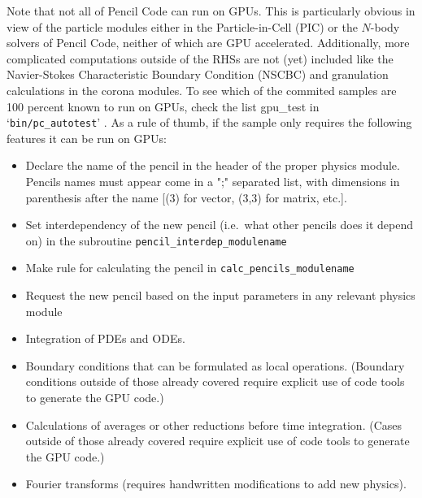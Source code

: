 \documentclass[\mydriver,12pt,twoside,notitlepage,a4paper]{article}
\makeatletter
\newcommand{\code}[1]{\texttt{#1}}
\newcommand{\file}[2][]{%
  \def\index@{#1}%
  `\texttt{#2}'%
  \ifx\index@\@empty\index[file]{#2@\texttt{#2}}%
  \else\index[file]{#1@\texttt{#1}}%
  \fi%
}
\makeatother
\begin{document}
Note that not all of Pencil Code can run on GPUs. 
This is particularly obvious in view of the particle modules either in the Particle-in-Cell (PIC) or the $N$-body solvers of Pencil Code, neither of which are GPU accelerated.
Additionally, more complicated computations outside of the RHSs are not (yet) included like the Navier-Stokes Characteristic Boundary Condition (NSCBC) and granulation calculations in the corona modules.
To see which of the commited samples are 100 percent known to run on GPUs, check the list gpu\_test in \file{bin/pc_autotest}.
As a rule of thumb, if the sample only requires the following features it can be run on GPUs:
\begin{itemize}
  \item Declare the name of the pencil in the header of the proper physics
      module. Pencils names must appear come in a ";" separated list, with
      dimensions in parenthesis after the name [(3) for vector, (3,3) for
      matrix, etc.].
  \item Set interdependency of the new pencil (i.e.\ what other pencils does it
      depend on) in the subroutine \code{pencil_interdep_modulename}
  \item Make rule for calculating the pencil in \code{calc_pencils_modulename}
  \item Request the new pencil based on the input parameters in any relevant
      physics module
\end{itemize}
\begin{itemize}
  \item Integration of PDEs and ODEs.
  \item  Boundary conditions that can be formulated
         as local operations. (Boundary conditions outside of those already covered require
         explicit use of code tools to generate the GPU code.)
  \item Calculations of averages or other reductions before time integration.
	(Cases outside of those already covered require explicit use of code tools to generate the GPU code.)
  \item Fourier transforms (requires handwritten modifications to add new physics).
\end{itemize}
\end{document}
